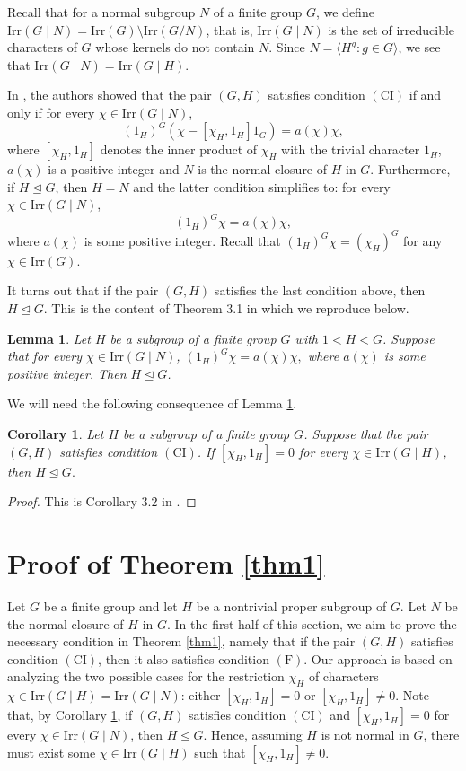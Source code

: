 \documentclass[twoside,a4paper,reqno,11pt]{amsart}
\newcommand{\<}{\langle}
\renewcommand{\>}{\rangle}
\newcommand{\la}{\langle}
\newcommand{\ra}{\rangle}
\newcommand{\Irr}{\mathrm {Irr}}
\newcommand{\F}{\mathrm{(F)}}
\newcommand{\CI}{\mathrm{(CI)}}
\renewcommand{\:}{\colon}
\newtheorem{lem}[thm]{Lemma}
\newtheorem{cor}[thm]{Corollary}
\theoremstyle{definition}
\begin{document}
Recall that for a normal subgroup $N$ of a finite group $G$, we define $\Irr(G\mid N)=\Irr(G)\setminus \Irr(G/N)$, that is, $\Irr(G\mid N)$ is the set of irreducible characters of $G$ whose kernels do not contain $N$. Since $N=\la H^g:g\in G\ra$, we see that $\Irr(G\mid N)=\Irr(G\mid H).$

In \cite[Theorem 2.1]{Ren-Lu-Li}, the authors showed that the pair $(G,H)$ satisfies condition $\CI$ if and only if for every $\chi\in\Irr(G\mid N)$, $$(1_H)^G(\chi-[\chi_H,1_H]1_G)=a(\chi)\chi,$$ where $[\chi_H,1_H]$ denotes the inner product of $\chi_H$ with the trivial character $1_H$, $a(\chi)$ is a positive integer and $N$ is the normal closure of $H$ in $G$. Furthermore, if $H\unlhd G$, then $H=N$ and the latter condition simplifies to: for every $\chi\in \Irr(G\mid N)$, $$(1_H)^G\chi=a(\chi)\chi,$$ where $a(\chi)$ is some positive integer. Recall that $(1_H)^G\chi=(\chi_H)^G$ for any $\chi\in\Irr(G).$

It turns out that if the pair $(G,H)$ satisfies the last condition above, then $H\unlhd G$. This is the content of Theorem 3.1 in \cite{Ren-Lu-Li} which we reproduce below.

\begin{lem}\label{lem:RLL} Let $H$ be a subgroup of a finite group $G$ with $1<H<G$. Suppose that for every $\chi\in \Irr(G\mid N)$, $(1_H)^G\chi=a(\chi)\chi,$ where $a(\chi)$ is some positive integer. Then $H\unlhd G$.
\end{lem}

We will need the following consequence of Lemma \ref{lem:RLL}. 

\begin{cor}\label{cor:RLL}
Let $H$ be a  subgroup of a finite group $G$. Suppose that the pair $(G,H)$ satisfies condition $\CI$. If $[\chi_H,1_H]=0$ for every $\chi\in\Irr(G\mid H)$, then $H\unlhd G.$
\end{cor}

\begin{proof}
This is Corollary 3.2 in \cite{Ren-Lu-Li}.
\end{proof}

\section{Proof of Theorem \ref{thm1}} \label{sec:s3}

Let $G$ be a finite group and let $H$ be a nontrivial proper subgroup of $G$. Let $N$ be the normal closure of $H$ in $G$. In the first half of this section, we aim to prove the necessary condition in Theorem \ref{thm1}, namely that if the pair $(G,H)$ satisfies condition $\CI$, then it also satisfies condition $\F$. Our approach is based on analyzing the two possible cases for the restriction $\chi_H$ of characters $\chi\in\Irr(G\mid H)=\Irr(G\mid N)$: either $[\chi_H,1_H]=0$ or $[\chi_H,1_H]\neq 0$. Note that, by  Corollary \ref{cor:RLL}, if  $(G,H)$ satisfies condition $\CI$ and $[\chi_H,1_H]=0$ for every $\chi\in \Irr(G\mid N)$, then  $H\unlhd G$. Hence, assuming $H$ is not normal in $G$, there must exist some  $\chi\in \Irr(G\mid H)$ such that $[\chi_H,1_H]\neq 0$. 
 
\end{document}

